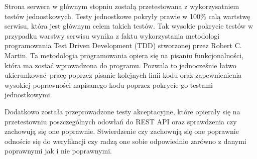\documentclass{article}
\begin{document}
Strona serwera w głównym stopniu zostałą przetestowana z wykorzysatniem testów jednostkowych. Testy jednostkowe pokryły prawie w 100\% calą wartstwę serwisu, która jest głównym celem takich testów.
Tak wysokie pokrycie testów w przypadku warstwy serwisu wynika z faktu wykorzystania metodologi programowania Test Driven Development (TDD) stworzonej przez Robert C. Martin. Ta metodologia programowania
opiera się na pisaniu funkcjonalności, która ma zostać wprowadzona do programu. Pozwala to jednocześnie łatwo ukierunkować pracę poprzez pisanie kolejnych linii kodu oraz zapewnienienia wysokiej poprawności
napisanego kodu poprzez pokrycie go testami jednostkowymi.

Dodatkowo została przeprowadzone testy akceptacyjne, które opierały się na przetestowniu poszczególnych odowłań do REST API oraz sprawdzenia czy zachowują się one
poprawnie. Stwierdzenie czy zachowują się one poprawnie odnoście się do weryfikacji czy radzą one sobie odpowiednio zarówno z danymi poprawnymi jak i nie poprawnymi.
\end{document}
